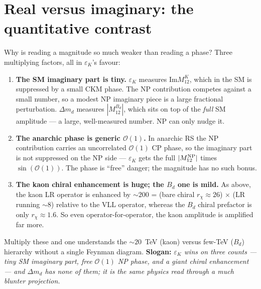 \documentclass[11pt]{article}
\newcommand{\Mtwelve}{M_{12}}
\newcommand{\dmd}{\Delta m_d}
\newcommand{\epsK}{\varepsilon_K}
\theoremstyle{definition}
\begin{document}
\section{Real versus imaginary: the quantitative contrast}
\label{sec:realvsimag}

Why is reading a magnitude so much weaker than reading a phase? Three multiplying
factors, all in $\epsK$'s favour:
\begin{enumerate}[leftmargin=1.8em]
\item \textbf{The SM imaginary part is tiny.} $\epsK$ measures $\mathrm{Im}
\Mtwelve^{K}$, which in the SM is suppressed by a small CKM phase. The NP
contribution competes against a small number, so a modest NP imaginary piece is a
large fractional perturbation. $\dmd$ measures $|\Mtwelve^{B_d}|$, which sits on
top of the \emph{full} SM amplitude --- a large, well-measured number. NP can only
nudge it.
\item \textbf{The anarchic phase is generic $\mathcal{O}(1)$.} In anarchic RS the
NP contribution carries an uncorrelated $\mathcal{O}(1)$ CP phase, so the
imaginary part is not suppressed on the NP side --- $\epsK$ gets the full
$|\Mtwelve^{\rm NP}|$ times $\sin(\mathcal{O}(1))$. The phase is ``free'' danger;
the magnitude has no such bonus.
\item \textbf{The kaon chiral enhancement is huge; the $B_d$ one is mild.} As
above, the kaon LR operator is enhanced by $\sim$$200$ = (bare chiral $r_\chi\approx26$)
$\times$ (LR running $\sim8$) relative to the VLL operator, whereas the $B_d$
chiral prefactor is only $r_\chi\approx1.6$. So even operator-for-operator, the
kaon amplitude is amplified far more.
\end{enumerate}
Multiply these and one understands the $\sim20$~TeV (kaon) versus few-TeV ($B_d$)
hierarchy without a single Feynman diagram. \textbf{Slogan:} \emph{$\epsK$ wins on
three counts --- tiny SM imaginary part, free $\mathcal{O}(1)$ NP phase, and a
giant chiral enhancement --- and $\dmd$ has none of them; it is the same physics
read through a much blunter projection.}
\end{document}
